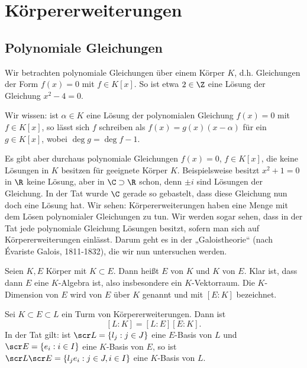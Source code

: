 \chapter{Körpererweiterungen}


\section{Polynomiale Gleichungen}

Wir betrachten polynomiale Gleichungen über einem Körper $K$, d.h. Gleichungen der Form $f(x) = 0$ mit $f \in K[x]$.
So ist etwa $2 \in \Z$ eine Lösung der Gleichung $x^2 - 4 = 0$.

Wir wissen: ist $\alpha \in K$ eine Lösung der polynomialen Gleichung $f(x) = 0$ mit $f \in K[x]$, so lässt sich $f$ schreiben als $f(x) = g(x)(x - \alpha)$ für ein $g \in K[x]$, wobei $\deg g = \deg f - 1$.

Es gibt aber durchaus polynomiale Gleichungen $f(x) = 0$, $f \in K[x]$, die keine Lösungen in $K$ besitzen für geeignete Körper $K$.
Beispielsweise besitzt $x^2 + 1 = 0$ in $\R$ keine Lösung, aber in $\C \supset \R$ schon, denn $\pm i$ sind Lösungen der Gleichung.
In der Tat wurde $\C$ gerade so gebastelt, dass diese Gleichung nun doch eine Lösung hat.
Wir sehen: Körpererweiterungen haben eine Menge mit dem Lösen polynomialer Gleichungen zu tun.
Wir werden sogar sehen, dass in der Tat jede polynomiale Gleichung Lösungen besitzt, sofern man sich auf Körpererweiterungen einlässt.
Darum geht es in der „Galoistheorie“ (nach Évariste Galois, 1811-1832), die wir nun untersuchen werden.

\begin{df} \label{18.1-1}
	Seien $K, E$ Körper mit $K \subset E$.
	Dann heißt $E$  von $K$ und $K$  von $E$.
	Klar ist, dass dann $E$ eine $K$-Algebra ist, also insbesondere ein $K$-Vektorraum.
	Die $K$-Dimension von $E$ wird  von $E$ über $K$ genannt und mit $[E : K]$ bezeichnet.
\end{df}

\begin{st} \label{18.1-2}
	Sei $K \subset E \subset L$ ein Turm von Körpererweiterungen.
	Dann ist
	\[
		[L : K] = [L : E] [E : K].
	\]
	In der Tat gilt: ist $\scr L = \{l_j : j \in J\}$ eine $E$-Basis von $L$ und $\scr E = \{ e_i : i \in I \}$ eine $K$-Basis von $E$, so ist $\scr L \scr E = \{ l_j e_i : j \in J, i \in I \}$ eine $K$-Basis von $L$.
\end{st}

